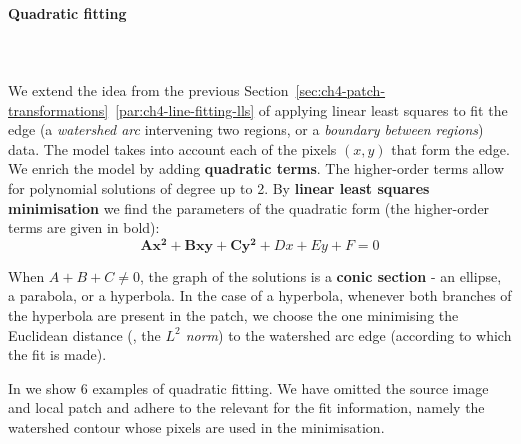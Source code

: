 \paragraph{Quadratic fitting}\mbox{}\\\mbox{}\\
\label{par:ch4-quadratic-lls-fitting}
We extend the idea from the previous Section~\ref*{sec:ch4-patch-transformations}~\ref{par:ch4-line-fitting-lls} of applying linear least squares to fit the edge (a {\it watershed arc} intervening two regions, or a {\it boundary between regions}) data. The model takes into account each of the pixels $(x,y)$ that form the edge. We enrich %
the model by adding {\bf quadratic terms}. The higher-order terms allow for polynomial solutions of degree up to 2. By {\bf linear least squares minimisation} we find the parameters of the quadratic form (the higher-order terms are given in bold): %
\[
 \mathbf{Ax^2+Bxy+Cy^2}+Dx+Ey+F=0
\]

When $A + B + C \ne 0$, the graph of the solutions is a \textbf{conic section} - an ellipse, a parabola, or a hyperbola. In the case of a hyperbola, whenever both branches of the hyperbola are present in the patch, we choose the one minimising the Euclidean distance (\ie, the {\it $L^2$ norm}) to the watershed arc edge (according to which the fit is made).

In  we show 6 examples of quadratic fitting. We have omitted the source image %
and local patch and adhere to %
the relevant for the fit information, namely the watershed contour whose pixels are used in the minimisation.

